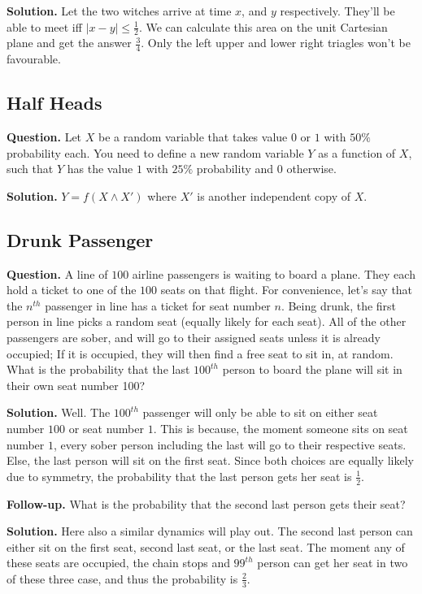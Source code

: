\textbf{Solution.} Let the two witches arrive at time $x$, and $y$ respectively. They'll be able to meet iff $|x - y| \leq \frac{1}{2}$. We can calculate this area on the unit Cartesian plane and get the answer $\frac{3}{4}$. Only the left upper and lower right triagles won't be favourable.

\subsection{Half Heads}
\textbf{Question.} Let $X$ be a random variable that takes value $0$ or $1$ with $50\%$ probability each. You need to define a new random variable $Y$ as a function of $X$, such that $Y$ has the value $1$ with $25\%$ probability and $0$ otherwise.

\textbf{Solution.} $Y = f(X \wedge X')$ where $X'$ is another independent copy of $X$.

\subsection{Drunk Passenger}
\textbf{Question.} A line of $100$ airline passengers is waiting to board a plane. They each hold a ticket to one of the $100$ seats on that flight. For convenience, let's say that the $n^{th}$ passenger in line has a ticket for seat number $n$. Being drunk, the first person in line picks a random seat (equally likely for each seat). All of the other passengers are sober, and will go to their assigned seats unless it is already occupied; If it is occupied, they will then find a free seat to sit in, at random. What is the probability that the last $100^{th}$ person to board the plane will sit in their own seat number 100?

\textbf{Solution.} Well. The $100^{th}$ passenger will only be able to sit on either seat number $100$ or seat number $1$. This is because, the moment someone sits on seat number $1$, every sober person including the last will go to their respective seats. Else, the last person will sit on the first seat. Since both choices are equally likely due to symmetry, the probability that the last person gets her seat is $\frac{1}{2}$.

\textbf{Follow-up.} What is the probability that the second last person gets their seat? 

\textbf{Solution.} Here also a similar dynamics will play out. The second last person can either sit on the first seat, second last seat, or the last seat. The moment any of these seats are occupied, the chain stops and $99^{th}$ person can get her seat in two of these three case, and thus the probability is $\frac{2}{3}$.

